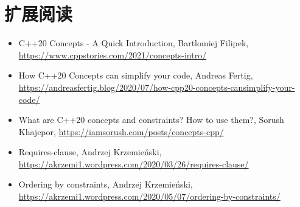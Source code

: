 \section{扩展阅读}
\begin{itemize}
  \item C++20 Concepts - A Quick Introduction, Bartlomiej Filipek, \url{https://www.cppstories.com/2021/concepts-intro/}
  \item How C++20 Concepts can simplify your code, Andreas Fertig, \url{https://andreasfertig.blog/2020/07/how-cpp20-concepts-cansimplify-your-code/}
  \item What are C++20 concepts and constraints? How to use them?, Sorush Khajepor, \url{https://iamsorush.com/posts/concepts-cpp/}
  \item Requires-clause, Andrzej Krzemieński, \url{https://akrzemi1.wordpress.com/2020/03/26/requires-clause/}
  \item Ordering by constraints, Andrzej Krzemieński, \url{https://akrzemi1.wordpress.com/2020/05/07/ordering-by-constraints/}
\end{itemize}